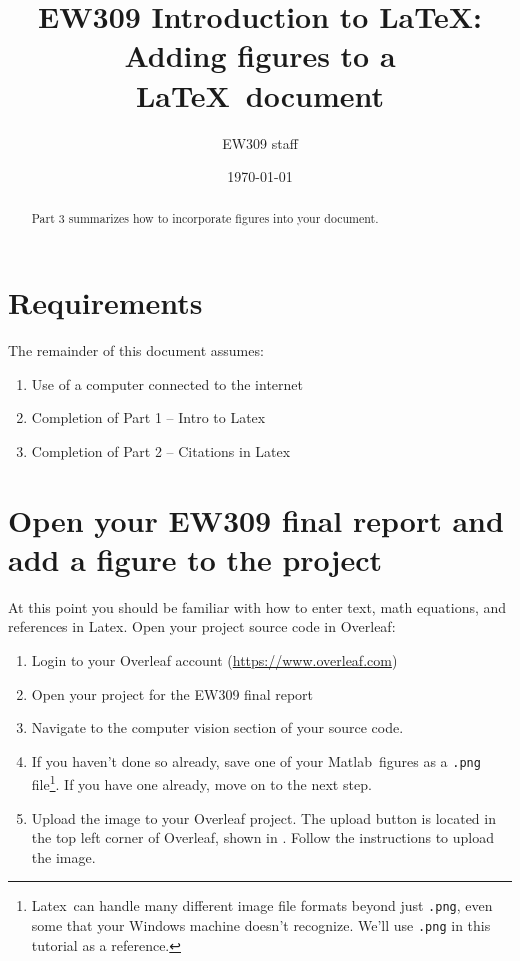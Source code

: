 \documentclass[10pt]{article}
\title{EW309 Introduction to \LaTeX: Adding figures to a \LaTeX\ document}
\author{EW309 staff}
\date{\today}
\renewcommand{\LaTeX}{Latex}
\newcommand{\Matlab}{Matlab}
\begin{document}
\maketitle 

\begin{abstract}
Part 3 summarizes how to incorporate figures into your document. 
\end{abstract}

\section{Requirements}
The remainder of this document assumes:
\begin{enumerate}
\item Use of a computer connected to the internet
\item Completion of Part 1 – Intro to \LaTeX
\item Completion of Part 2 – Citations in \LaTeX
\end{enumerate}





\section{Open your EW309 final report and add a figure to the project}
At this point you should be familiar with how to enter text, math equations, and references in \LaTeX. Open your project source code in Overleaf:
\begin{enumerate}
\item Login to your Overleaf account (\url{https://www.overleaf.com})
\item Open your project for the EW309 final report
\item Navigate to the computer vision section of your source code.
\item If you haven’t done so already, save one of your \Matlab\ figures as a \lstinline{.png} file\footnote{\LaTeX\ can handle many different image file formats beyond just \lstinline{.png}, even some that your Windows machine doesn't recognize. We'll use \lstinline{.png} in this tutorial as a reference.}. If you have one already, move on to the next step.
\item Upload the image to your Overleaf project. The upload button is located in the top left corner of Overleaf, shown in . Follow the instructions to upload the image.
\end{enumerate}
\end{document}
